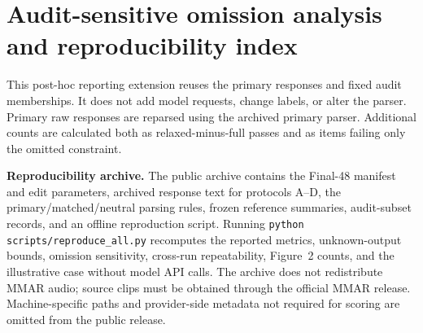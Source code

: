 \section{Audit-sensitive omission analysis and reproducibility index}
\label{sec:audit-extension}
This post-hoc reporting extension reuses the primary responses and fixed audit memberships. It does not add model requests, change labels, or alter the parser. Primary raw responses are reparsed using the archived primary parser. Additional counts are calculated both as relaxed-minus-full passes and as items failing only the omitted constraint.

\textbf{Reproducibility archive.} The public archive contains the Final-48 manifest and edit parameters, archived response text for protocols A--D, the primary/matched/neutral parsing rules, frozen reference summaries, audit-subset records, and an offline reproduction script. Running \texttt{python scripts/reproduce\_all.py} recomputes the reported metrics, unknown-output bounds, omission sensitivity, cross-run repeatability, Figure~2 counts, and the illustrative case without model API calls. The archive does not redistribute MMAR audio; source clips must be obtained through the official MMAR release. Machine-specific paths and provider-side metadata not required for scoring are omitted from the public release.

